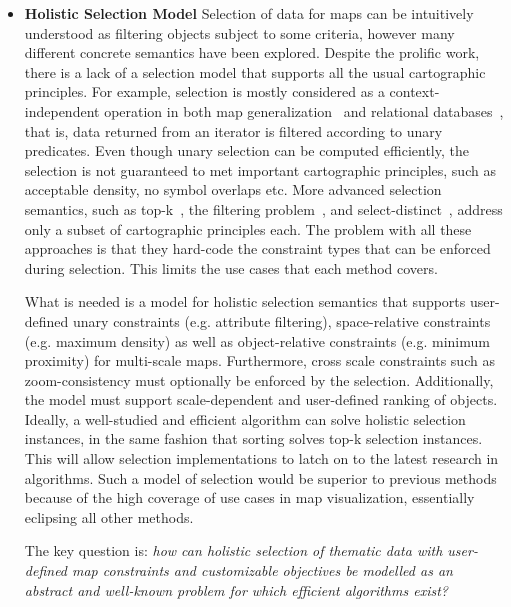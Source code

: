 \documentclass[11pt, oneside]{report}
\begin{document}
\begin{itemize}

\item \textbf{Holistic Selection Model}
Selection of data for maps can be intuitively understood as filtering objects subject to some criteria, however many different concrete semantics have been explored. Despite the prolific work, there is a lack of a selection model that supports all the usual cartographic principles. For example, selection is mostly considered as a context-independent operation in both map generalization~\cite{weibel1999generalising} and relational databases~\cite{sql}, that is, data returned from an iterator is filtered according to unary predicates. Even though unary selection can be computed efficiently, the selection is not guaranteed to met important cartographic principles, such as acceptable density, no symbol overlaps etc. More advanced selection semantics, such as top-k~\cite{rocha2011efficient}, the filtering problem~\cite{sarma2012fusiontables}, and select-distinct~\cite{nutanong2012multiresolution}, address only a subset of cartographic principles each. The problem with all these approaches is that they hard-code the constraint types that can be enforced during selection. This limits the use cases that each method covers.

What is needed is a model for holistic selection semantics that supports user-defined unary constraints (e.g. attribute filtering), space-relative constraints (e.g. maximum density) as well as object-relative constraints (e.g. minimum proximity) for multi-scale maps. Furthermore, cross scale constraints such as zoom-consistency must optionally be enforced by the selection. Additionally, the model must support scale-dependent and user-defined ranking of objects. Ideally, a well-studied and efficient algorithm can solve holistic selection instances, in the same fashion that sorting solves top-k selection instances. This will allow selection implementations to latch on to the latest research in algorithms. Such a model of selection would be superior to previous methods because of the high coverage of use cases in map visualization, essentially eclipsing all other methods.

The key question is: \emph{how can holistic selection of thematic data with user-defined map constraints and customizable objectives be modelled as an abstract and well-known problem for which efficient algorithms exist?}


\end{itemize}
\end{document}
